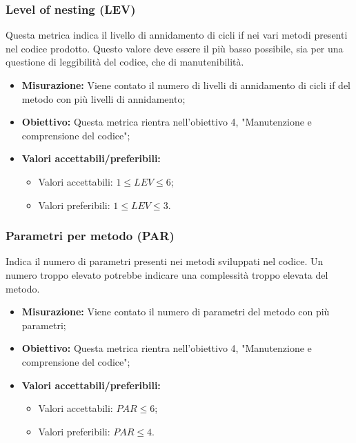 \subsubsection{Level of nesting (LEV)}
Questa metrica indica il livello di annidamento di cicli if nei vari metodi presenti nel codice prodotto. Questo valore deve essere il più basso possibile, sia per una questione di leggibilità del codice, che di manutenibilità.
\begin{itemize}
	\item \textbf{Misurazione:} Viene contato il numero di livelli di annidamento di cicli if del metodo con più livelli di annidamento;
	\item \textbf{Obiettivo:} Questa metrica rientra nell'obiettivo 4, "Manutenzione e comprensione del codice";
	\item \textbf{Valori accettabili/preferibili: }
	\begin{itemize}
		\item Valori accettabili: $1\leq LEV \leq 6$;
		\item Valori preferibili: $1\leq LEV \leq 3$.
	\end{itemize}
\end{itemize}


\subsubsection{Parametri per metodo (PAR)}
Indica il numero di parametri presenti nei metodi sviluppati nel codice. Un numero troppo elevato potrebbe indicare una complessità troppo elevata del metodo.
\begin{itemize}
	\item \textbf{Misurazione:} Viene contato il numero di parametri del metodo con più parametri;
	\item \textbf{Obiettivo:} Questa metrica rientra nell'obiettivo 4, "Manutenzione e comprensione del codice";
	\item \textbf{Valori accettabili/preferibili: }
	\begin{itemize}
		\item Valori accettabili: $PAR \leq 6$;
		\item Valori preferibili: $PAR \leq 4$.
	\end{itemize}
\end{itemize}

